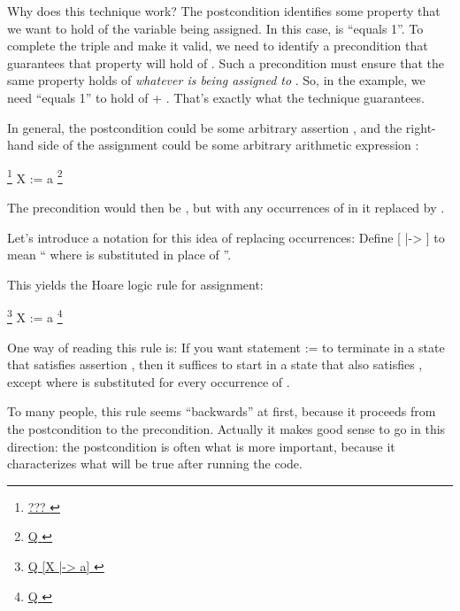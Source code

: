 \documentclass[12pt]{report}
\begin{document}
    Why does this technique work?  The postcondition identifies some
    property  that we want to hold of the variable  being
    assigned.  In this case,  is ``equals 1''.  To complete the
    triple and make it valid, we need to identify a precondition that
    guarantees that property will hold of .  Such a precondition
    must ensure that the same property holds of \textit{whatever is being
    assigned to} .  So, in the example, we need ``equals 1'' to
    hold of  + .  That's exactly what the technique guarantees. 

 In general, the postcondition could be some arbitrary assertion
    , and the right-hand side of the assignment could be some
    arbitrary arithmetic expression :


       \footnote{\url{ ??? }}  X := a  \footnote{\url{ Q }}


    The precondition would then be , but with any occurrences of
     in it replaced by .


    Let's introduce a notation for this idea of replacing occurrences:
    Define  [ |-> ] to mean `` where  is substituted in
    place of ''.


    This yields the Hoare logic rule for assignment:


      \footnote{\url{ Q [X |-> a] }}  X := a  \footnote{\url{ Q }}


    One way of reading this rule is: If you want statement  := 
    to terminate in a state that satisfies assertion , then it
    suffices to start in a state that also satisfies , except
    where  is substituted for every occurrence of . 

 To many people, this rule seems ``backwards'' at first, because
    it proceeds from the postcondition to the precondition.  Actually
    it makes good sense to go in this direction: the postcondition is
    often what is more important, because it characterizes what will be
    true after running the code.
\end{document}
